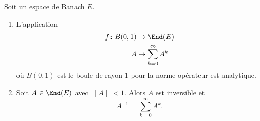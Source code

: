 \begin{proposition}	\label{PROPooPVZBooESAiRv}
	Soit un espace de Banach \( E\).

	\begin{enumerate}
		\item
		      L'application
		      \begin{equation}
			      \begin{aligned}
				      f\colon B(0,1) & \to \End(E)                    \\
				      A              & \mapsto \sum_{k=0}^{\infty}A^k
			      \end{aligned}
		      \end{equation}
		      où \( B(0,1)\) est le boule de rayon \( 1\) pour la norme opérateur est analytique.
		\item
		      Soit \( A\in \End(E)\) avec \( \| A \|<1\). Alors \( A\) est inversible et
		      \begin{equation}
			      A^{-1}=\sum_{k=0}^{\infty}A^k.
		      \end{equation}
	\end{enumerate}
\end{proposition}

